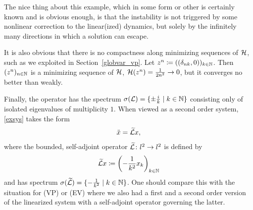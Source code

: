 \documentclass[11pt]{article}
\begin{document}
The nice thing about this example, which in some form or other is certainly
known and is obvious enough, is that the instability is not triggered
by some nonlinear correction to the linear(ized) dynamics, but solely by
the infinitely many directions in which a solution can escape.

It is also obvious that there is no compactness along minimizing sequences
of ${\cal H}$, such as we exploited in Section~\ref{globvar_vp}. Let
$z^n\coloneqq((\delta_{nk},0))_{k\in \mathbb N}$. Then $(z^n)_{n\in \mathbb N}$
is a minimizing sequence of ${\cal H}$, ${\cal H}(z^n) = \frac{1}{2 n^2} \to 0$,
but it converges no better than weakly.

Finally, the operator has the spectrum
$\sigma({\cal L}) = \{\pm \frac{i}{k} \mid k\in \mathbb N\}$
consisting only of isolated eigenvalues of multiplicity $1$. When viewed as
a second order system, \eqref{exsys} takes the form
\[
\ddot x = \widetilde{{\cal L}} x,
\]
where the bounded, self-adjoint operator $\widetilde{{\cal L}}\colon l^2 \to l^2$
is defined by
\[
\widetilde{{\cal L}} x \coloneqq\left(-\frac{1}{k^2}x_k\right)_{k\in \mathbb N}
\]
and has spectrum
$\sigma(\widetilde{{\cal L}}) = \{-\frac{1}{k^2} \mid k\in \mathbb N\}$.
One should compare this with the situation for (VP) or (EV)
where we also had a first and a second order version of the linearized
system with a self-adjoint operator governing the latter.
%
%
\end{document}
